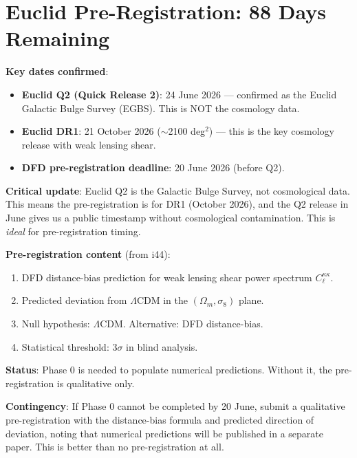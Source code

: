\documentclass[11pt,a4paper]{article}
\begin{document}
\section{Euclid Pre-Registration: 88 Days Remaining}

\begin{tcolorbox}[colback=red!5!white, colframe=red!60!black,
  title={DEADLINE: Euclid Pre-Registration --- 20 June 2026 (88 days from today)}]

\textbf{Key dates confirmed}:
\begin{itemize}
\item \textbf{Euclid Q2 (Quick Release 2)}: 24 June 2026 --- confirmed as the Euclid Galactic Bulge Survey (EGBS). This is NOT the cosmology data.
\item \textbf{Euclid DR1}: 21 October 2026 ($\sim$2100 deg$^2$) --- this is the key cosmology release with weak lensing shear.
\item \textbf{DFD pre-registration deadline}: 20 June 2026 (before Q2).
\end{itemize}

\textbf{Critical update}: Euclid Q2 is the Galactic Bulge Survey, not cosmological data. This means the pre-registration is for DR1 (October 2026), and the Q2 release in June gives us a public timestamp without cosmological contamination. This is \emph{ideal} for pre-registration timing.

\textbf{Pre-registration content} (from i44):
\begin{enumerate}
\item DFD distance-bias prediction for weak lensing shear power spectrum $C_\ell^{\kappa\kappa}$.
\item Predicted deviation from $\Lambda$CDM in the $(\Omega_m, \sigma_8)$ plane.
\item Null hypothesis: $\Lambda$CDM. Alternative: DFD distance-bias.
\item Statistical threshold: $3\sigma$ in blind analysis.
\end{enumerate}

\textbf{Status}: Phase 0 is needed to populate numerical predictions. Without it, the pre-registration is qualitative only.

\textbf{Contingency}: If Phase 0 cannot be completed by 20 June, submit a qualitative pre-registration with the distance-bias formula and predicted direction of deviation, noting that numerical predictions will be published in a separate paper. This is better than no pre-registration at all.
\end{tcolorbox}
\end{document}
